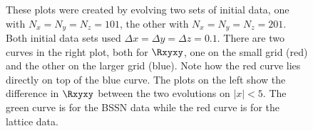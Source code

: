 \documentclass[a4paper,12pt]{article}
\numberwithin{equation}{section}
\begin{document}
\begin{figure}[!ht]
%
\caption{
These plots were created by evolving two sets of initial data, one with
$N_x=N_y=N_z=101$, the other with $N_x=N_y=N_z=201$. Both initial data sets
used $\Delta x=\Delta y=\Delta z=0.1$. There are two curves in the right plot,
both for $\Rxyxy$, one on the small grid (red) and the other on the larger
grid (blue). Note how the red curve lies directly on top of the blue curve.
The plots on the left show the difference in $\Rxyxy$ between the two
evolutions on $\vert x\vert < 5$. The green curve is for the BSSN data while
the red curve is for the lattice data.}
\label{fig:TeukBCTest}
\end{figure}
\end{document}
